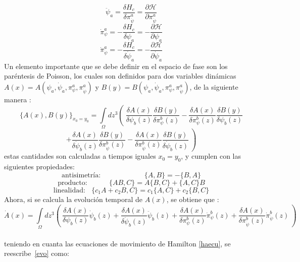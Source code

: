 \documentclass[a4paper,12pt]{article}
\begin{document}
$$\ddot\psi_a=\frac{\delta H_c}{\delta \pi^{a}_{\dot\psi}}=\frac{\partial \mathscr{H}}{\partial\pi^{a}_{\dot\psi}}$$ 
$$\dot\pi^{a}_{\psi}=-\frac{\delta H_c}{\delta \psi_a}=-\frac{\partial \mathscr{H}}{\partial\psi_a}$$
$$\dot\pi^{a}_{\dot\psi}=-\frac{\delta H_c}{\delta\dot\psi_a}=-\frac{\partial \mathscr{H}}{\partial\dot\psi_a}$$  
Un elemento importante que se debe definir en el espacio de fase son los paréntesis de Poisson, los cuales son definidos para dos variables \mbox{dinámicas \mbox{$A(x)=A(\psi_a,\dot\psi_a,\pi^{a}_{\psi},\pi^{a}_{\dot\psi})$}} y \mbox{$B(y)=B(\psi_a,\dot\psi_a,\pi^{a}_{\psi},\pi^{a}_{\dot\psi})$}, de la siguiente \mbox{manera} \cite{general,canoalor,tesis}:
\begin{equation}
\{A(x),B(y)\}_{x_0=y_0}=\int\limits_{\Omega}dz^3\left(\ \frac{\delta A(x)}{\delta\psi_b(z)}\frac{\delta B(y)}{\delta \pi^{b}_{\psi}(z) }-\frac{\delta A(x)}{\delta \pi^{b}_{\psi}(z) }\frac{\delta B(y)}{\delta\psi_b(z)}\right. 
\label{parepo}
\end{equation}
$$\left.+\frac{\delta A(x)}{\delta \dot\psi_{b}(z)}\frac{\delta B(y)}{\delta \pi^{b}_{\dot\psi}(z) }-\frac{\delta A(x)}{\delta \pi^{b}_{\dot\psi}(z) }\frac{\delta B(y)}{\delta \dot\psi_{b}(z) }\ \right)$$
estas cantidades son calculadas a tiempos iguales \mbox{$x_0=y_0$}, y cumplen con las siguientes propiedades:
\begin{equation}
\mbox{antisimetría:} \ \ \ \  \ \ \  \ \ \ \ \  \ \ \ \ \ \ \ \  \ \ \ \ \  \ \ \ \{A,B\}=-\{B,A\}  
\end{equation}
\begin{equation}
\mbox{producto:}\  \ \ \ \ \ \ \ \ \ \  \ \ \ \{AB,C\}=A\{B,C\}+\{A,C\}B 
\end{equation}
\begin{equation}
\mbox{linealidad:}\ \ \ \ \{c_1A+c_2B,C\}=c_1\{A,C\}+c_2\{B,C\} 
\end{equation}
Ahora, si se calcula la evolución temporal de $A(x)$, se obtiene que \cite{general,canoalor,tesis}:
{\small
\begin{equation}
\dot A(x)=\int\limits_{\Omega}dz^3\left(\ \frac{\delta A(x)}{\delta\psi_b(z)}\dot\psi_b(z)+\frac{\delta A(x)}{\delta \dot\psi_{b}(z)}\ddot\psi_b(z)+\frac{\delta A(x)}{\delta \pi^{b}_{\psi}(z) }\dot\pi^{b}_{\psi}(z)+\frac{\delta A(x)}{\delta \pi^{b}_{\dot\psi}(z) }\dot\pi^{b}_{\dot\psi}(z)\ \right) 
\label{evo}
\end{equation}}\\
teniendo en cuanta las ecuaciones de movimiento de Hamilton \eqref{haecu}, se \mbox{reescribe \eqref{evo}} como:
\end{document}
